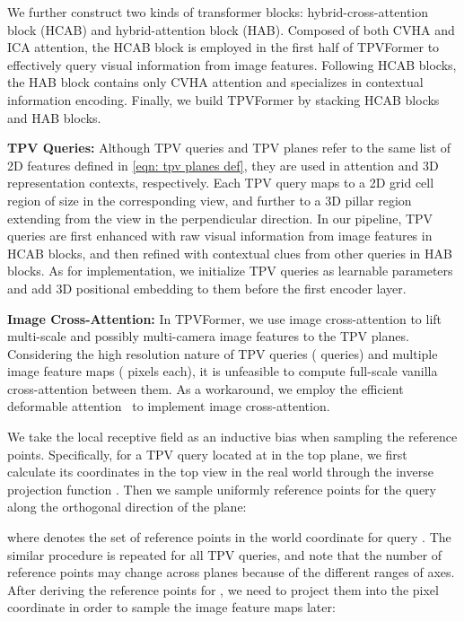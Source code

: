 \documentclass[10pt,twocolumn,letterpaper]{article}
\begin{document}
We further construct two kinds of transformer blocks: hybrid-cross-attention block (HCAB) and hybrid-attention block (HAB).
Composed of both CVHA and ICA attention, the HCAB block is employed in the first half of TPVFormer to effectively query visual information from image features.
Following HCAB blocks, the HAB block contains only CVHA attention and specializes in contextual information encoding. 
Finally, we build TPVFormer by stacking  HCAB blocks and  HAB blocks.

\textbf{TPV Queries:}
Although TPV queries and TPV planes refer to the same list of 2D features defined in \eqref{eqn: tpv planes def}, they are used in attention and 3D representation contexts, respectively.
Each TPV query maps to a 2D grid cell region of size  in the corresponding view, and further to a 3D pillar region extending from the view in the perpendicular direction.
In our pipeline, TPV queries are first enhanced with raw visual information from image features in HCAB blocks, and then refined with contextual clues from other queries in HAB blocks.
As for implementation, we initialize TPV queries as learnable parameters and add 3D positional embedding to them before the first encoder layer.

\textbf{Image Cross-Attention:}
In TPVFormer, we use image cross-attention to lift multi-scale and possibly multi-camera image features to the TPV planes.
Considering the high resolution nature of TPV queries ( queries) and multiple image feature maps ( pixels each), it is unfeasible to compute full-scale vanilla cross-attention between them.
As a workaround, we employ the efficient deformable attention~\cite{deformable_DETR,dcn} to implement image cross-attention.

We take the local receptive field as an inductive bias when sampling the reference points.
Specifically, for a TPV query  located at  in the top plane, we first calculate its coordinates  in the top view in the real world through the inverse projection function .
Then we sample uniformly  reference points for the query  along the orthogonal direction of the plane:


where  denotes the set of reference points in the world coordinate for query .
The similar procedure is repeated for all TPV queries, and note that the number of reference points  may change across planes because of the different ranges of axes. 
After deriving the reference points for , we need to project them into the pixel coordinate in order to sample the image feature maps later:
\end{document}
